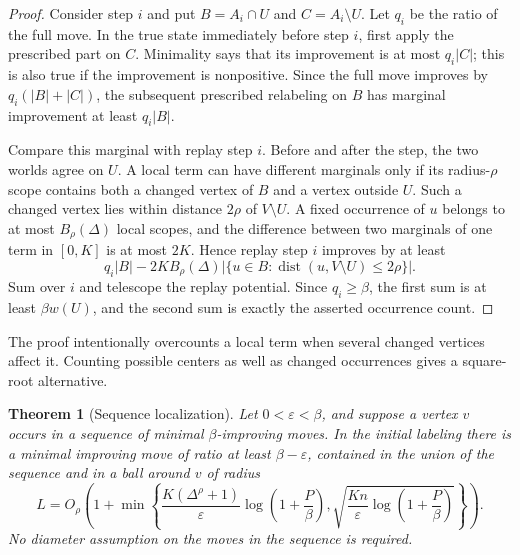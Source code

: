\documentclass[11pt]{article}
\newtheorem{theorem}{Theorem}[section]
\theoremstyle{definition}
\theoremstyle{remark}
\newcommand{\dist}{\operatorname{dist}}
\newcommand{\eps}{\varepsilon}
\begin{document}
\begin{proof}
Consider step $i$ and put $B=A_i\cap U$ and $C=A_i\setminus U$.  Let $q_i$ be the
ratio of the full move.  In the true state immediately before step $i$, first apply
the prescribed part on $C$.  Minimality says that its improvement is at most
$q_i|C|$; this is also true if the improvement is nonpositive.  Since the full move
improves by $q_i(|B|+|C|)$, the subsequent prescribed relabeling on $B$ has marginal
improvement at least $q_i|B|$.

Compare this marginal with replay step $i$.  Before and after the step, the two
worlds agree on $U$.  A local term can have different marginals only if its
radius-$\rho$ scope contains both a changed vertex of $B$ and a vertex outside $U$.
Such a changed vertex lies within distance $2\rho$ of $V\setminus U$.  A fixed
occurrence of $u$ belongs to at most $B_\rho(\Delta)$ local scopes, and the difference
between two marginals of one term in $[0,K]$ is at most $2K$.  Hence replay step $i$
improves by at least
\[
 q_i|B|-2K B_\rho(\Delta)
 |\{u\in B:\dist(u,V\setminus U)\leq2\rho\}|.
\]
Sum over $i$ and telescope the replay potential.  Since $q_i\geq\beta$, the first
sum is at least $\beta w(U)$, and the second sum is exactly the asserted occurrence
count.
\end{proof}

The proof intentionally overcounts a local term when several changed vertices affect
it.  Counting possible centers as well as changed occurrences gives a square-root
alternative.

\begin{theorem}[Sequence localization]\label{thm:localization}
Let $0<\eps<\beta$, and suppose a vertex $v$ occurs in a sequence of minimal
$\beta$-improving moves.  In the initial labeling there is a minimal improving move
of ratio at least $\beta-\eps$, contained in the union of the sequence and in a ball
around $v$ of radius
\begin{equation}\label{eq:localradius}
 L=O_\rho\!\left(
 1+\min\left\{
 \frac{K(\Delta^\rho+1)}{\eps}\log\!\left(1+\frac{P}{\beta}\right),
 \sqrt{\frac{Kn}{\eps}\log\!\left(1+\frac{P}{\beta}\right)}
 \right\}\right).
\end{equation}
No diameter assumption on the moves in the sequence is required.
\end{theorem}
\end{document}
